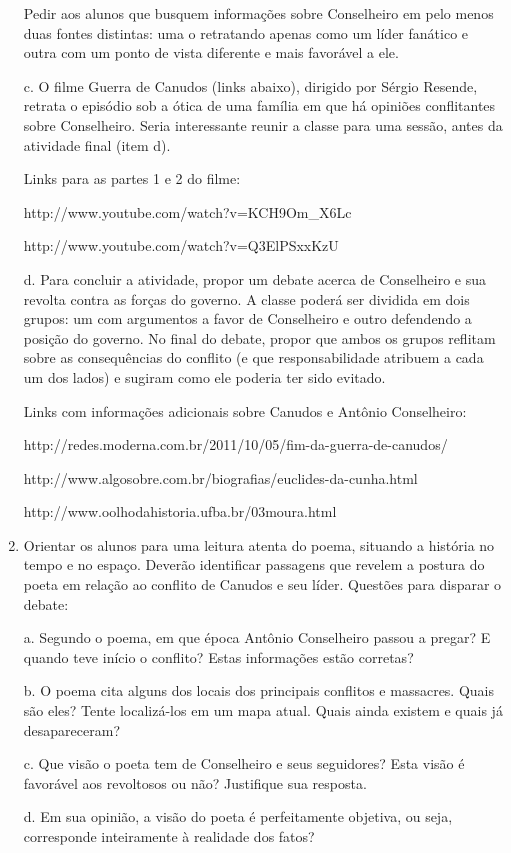\begin{enumerate}
Pedir aos alunos que busquem informações sobre Conselheiro em pelo menos
duas fontes distintas: uma o retratando apenas como um líder fanático e
outra com um ponto de vista diferente e mais favorável a ele.

c. O filme Guerra de Canudos (links abaixo), dirigido por Sérgio
Resende, retrata o episódio sob a ótica de uma família em que há
opiniões conflitantes sobre Conselheiro. Seria interessante reunir a
classe para uma sessão, antes da atividade final (item d). 

Links para as partes 1 e 2 do filme:

http://www.youtube.com/watch?v=KCH9Om\_X6Lc

http://www.youtube.com/watch?v=Q3ElPSxxKzU

d. Para concluir a atividade, propor um debate acerca de Conselheiro
e sua revolta contra as forças do governo. A classe poderá ser dividida
em dois grupos: um com argumentos a favor de Conselheiro e outro
defendendo a posição do governo. No final do debate, propor que ambos
os grupos reflitam sobre as consequências do conflito (e que
responsabilidade atribuem a cada um dos lados) e sugiram como ele
poderia ter sido evitado.

Links com informações adicionais sobre Canudos e Antônio Conselheiro:

http://redes.moderna.com.br/2011/10/05/fim-da-guerra-de-canudos/

http://www.algosobre.com.br/biografias/euclides-da-cunha.html

http://www.oolhodahistoria.ufba.br/03moura.html


\item Orientar os alunos para uma leitura atenta do poema, situando a história
no tempo e no espaço. Deverão identificar passagens que revelem a
postura do poeta em relação ao conflito de Canudos e seu líder.
Questões para disparar o debate:

a. Segundo o poema, em que época Antônio Conselheiro passou a pregar?
E quando teve início o conflito? Estas informações estão corretas?


b. O poema cita alguns dos locais dos principais conflitos e
massacres. Quais são eles? Tente localizá-los em um mapa atual. Quais
ainda existem e quais já desapareceram?

c. Que visão o poeta tem de Conselheiro e seus seguidores? Esta visão
é favorável aos revoltosos ou não? Justifique sua resposta.

d. Em sua opinião, a visão do poeta é perfeitamente objetiva, ou
seja, corresponde inteiramente à realidade dos fatos?



\end{enumerate}
